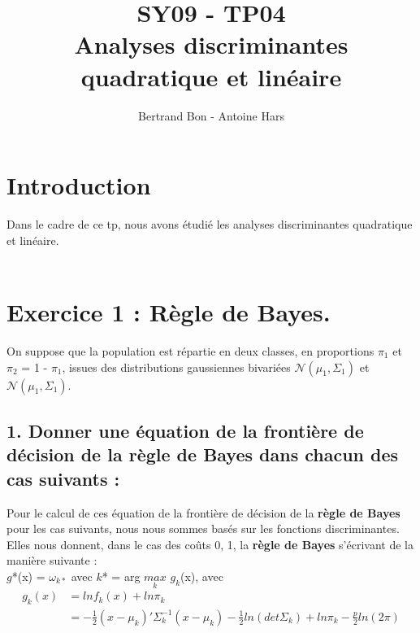\documentclass[a4paper, 10pt]{article}
\title{SY09 - TP04\\Analyses discriminantes quadratique et linéaire}
\author{Bertrand Bon - Antoine Hars}
\begin{document}
\maketitle

\section*{Introduction}
Dans le cadre de ce tp, nous avons étudié les analyses discriminantes quadratique et linéaire.\\ \\

\section*{Exercice 1 : Règle de Bayes.}
On suppose que la population est répartie en deux classes, en proportions $\pi_{1}$ et $\pi_{2}$ = 1 - $\pi_{1}$,
issues des distributions gaussiennes bivariées $\mathcal{N}(\mu_{1}, \Sigma_{1})$ et $\mathcal{N}(\mu_{1}, \Sigma_{1})$.\\

\subsection*{1. Donner une équation de la frontière de décision de la règle de Bayes dans chacun des cas suivants :}
Pour le calcul de ces équation de la frontière de décision de la \textbf{règle de Bayes} pour les cas suivants,
nous nous sommes basés sur les fonctions discriminantes.\\
Elles nous donnent, dans le cas des coûts {0, 1}, la \textbf{règle de Bayes} s'écrivant de la manière suivante :\\
$g$*(x) = $\omega_{k*}$ avec $k$* = arg $\underset{k}{max}$ $g_{k}$(x), avec\\
\begin{align*}
g_{k}(x) &= ln f_{k}(x) + ln \pi_{k}\\
 	 &= -\frac{1}{2}(x - \mu_{k})' \Sigma_{k}^{-1} (x - \mu_{k}) - \frac{1}{2} ln(det \Sigma_{k}) + ln \pi_{k} - \frac{p}{2} ln(2\pi)
\end{align*}
\end{document}
